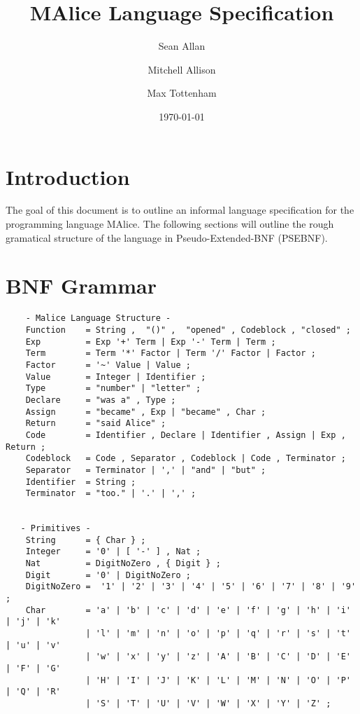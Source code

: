 \documentclass[a4wide, 11pt]{article}
\begin{document}
\title{MAlice Language Specification}

\author{Sean Allan \and Mitchell Allison \and Max Tottenham}

\date{\today}         %

\maketitle            %

\section{Introduction}

The goal of this document is to outline an informal language specification for 
the programming language MAlice. The following sections will outline the rough
gramatical structure of the language in Pseudo-Extended-BNF (PSEBNF). 

\section{BNF Grammar} 

\begin{verbatim}
    - Malice Language Structure - 
    Function    = String ,  "()" ,  "opened" , Codeblock , "closed" ;
    Exp         = Exp '+' Term | Exp '-' Term | Term ;
    Term        = Term '*' Factor | Term '/' Factor | Factor ;
    Factor      = '~' Value | Value ;
    Value       = Integer | Identifier ;
    Type        = "number" | "letter" ;
    Declare     = "was a" , Type ;
    Assign      = "became" , Exp | "became" , Char ;
    Return      = "said Alice" ;
    Code        = Identifier , Declare | Identifier , Assign | Exp , Return ;
    Codeblock   = Code , Separator , Codeblock | Code , Terminator ; 
    Separator   = Terminator | ',' | "and" | "but" ; 
    Identifier  = String ;
    Terminator  = "too." | '.' | ',' ;
    

   - Primitives -
    String      = { Char } ;
    Integer     = '0' | [ '-' ] , Nat ;
    Nat         = DigitNoZero , { Digit } ;
    Digit       = '0' | DigitNoZero ; 
    DigitNoZero =  '1' | '2' | '3' | '4' | '5' | '6' | '7' | '8' | '9' ;
    Char        = 'a' | 'b' | 'c' | 'd' | 'e' | 'f' | 'g' | 'h' | 'i' | 'j' | 'k' 
                | 'l' | 'm' | 'n' | 'o' | 'p' | 'q' | 'r' | 's' | 't' | 'u' | 'v'
                | 'w' | 'x' | 'y' | 'z' | 'A' | 'B' | 'C' | 'D' | 'E' | 'F' | 'G'
                | 'H' | 'I' | 'J' | 'K' | 'L' | 'M' | 'N' | 'O' | 'P' | 'Q' | 'R'
                | 'S' | 'T' | 'U' | 'V' | 'W' | 'X' | 'Y' | 'Z' ;
 
\end{verbatim}
\end{document}
